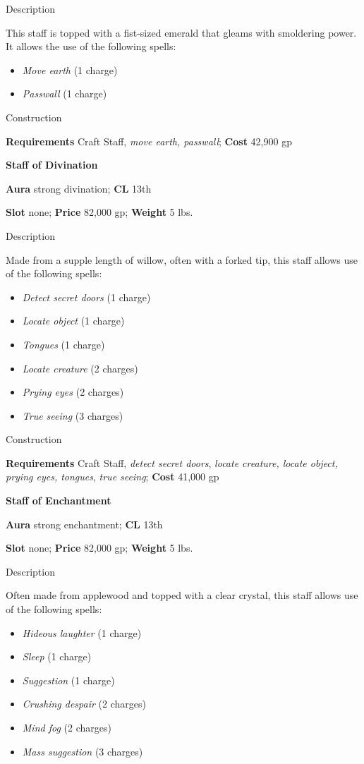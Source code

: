 Description
				
This staff is topped with a fist-sized emerald that gleams with smoldering power. It allows the use of the following spells: 
				\begin{itemize}\item  \textit{Move earth} (1 charge) 
				\item  \textit{Passwall} (1 charge)
\end{itemize}
				
Construction
				
\textbf{Requirements} Craft Staff, \textit{move earth, passwall}; \textbf{Cost }42,900 gp
				
\textbf{Staff of Divination}
				
\textbf{Aura} strong divination; \textbf{CL} 13th
				
\textbf{Slot} none; \textbf{Price} 82,000 gp; \textbf{Weight} 5 lbs.
				
Description
				
Made from a supple length of willow, often with a forked tip, this staff allows use of the following spells:
				\begin{itemize}\item  \textit{Detect secret doors} (1 charge)
				\item  \textit{Locate object} (1 charge)
				\item  \textit{Tongues} (1 charge)
				\item  \textit{Locate creature} (2 charges)
				\item  \textit{Prying eyes} (2 charges)
				\item  \textit{True seeing} (3 charges) 
\end{itemize}
				
Construction
				
\textbf{Requirements} Craft Staff, \textit{detect secret doors}, \textit{locate creature, locate object, prying eyes, tongues}, \textit{true seeing}; \textbf{Cost }41,000 gp
				
\textbf{Staff of Enchantment}
				
\textbf{Aura} strong enchantment; \textbf{CL} 13th
				
\textbf{Slot} none; \textbf{Price} 82,000 gp; \textbf{Weight} 5 lbs.
				
Description
				
Often made from applewood and topped with a clear crystal, this staff allows use of the following spells:
				\begin{itemize}\item  \textit{Hideous laughter} (1 charge)
				\item  \textit{Sleep} (1 charge)
				\item  \textit{Suggestion} (1 charge)
				\item  \textit{Crushing despair} (2 charges)
				\item  \textit{Mind fog} (2 charges)
				\item  \textit{Mass suggestion} (3 charges) 
\end{itemize}
				
